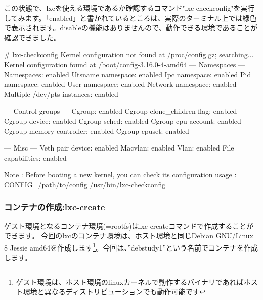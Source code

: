 \documentclass[mingoth,a4paper]{jsarticle}
\begin{document}
この状態で、lxcを使える環境であるか確認するコマンド"lxc-checkconfig"を実行してみます。「enabled」と書かれているところは、実際のターミナル上では緑色で表示されます。disableの機能はありませんので、動作できる環境であることが確認できました。

\begin{commandline}
  # lxc-checkconfig
  Kernel configuration not found at /proc/config.gz; searching...
  Kernel configuration found at /boot/config-3.16.0-4-amd64
  --- Namespaces ---
  Namespaces: enabled
  Utsname namespace: enabled
  Ipc namespace: enabled
  Pid namespace: enabled
  User namespace: enabled
  Network namespace: enabled
  Multiple /dev/pts instances: enabled

  --- Control groups ---
  Cgroup: enabled
  Cgroup clone_children flag: enabled
  Cgroup device: enabled
  Cgroup sched: enabled
  Cgroup cpu account: enabled
  Cgroup memory controller: enabled
  Cgroup cpuset: enabled

  --- Misc ---
  Veth pair device: enabled
  Macvlan: enabled
  Vlan: enabled
  File capabilities: enabled

  Note : Before booting a new kernel, you can check its configuration
  usage : CONFIG=/path/to/config /usr/bin/lxc-checkconfig
\end{commandline}

\subsubsection{コンテナの作成:lxc-create}

ゲスト環境となるコンテナ環境(=rootfs)はlxc-createコマンドで作成することができます。
今回のlxcのコンテナ環境は、ホスト環境と同じDebian GNU/Linux 8 Jessie amd64を作成します\footnote{ゲスト環境は、ホスト環境のlinuxカーネルで動作するバイナリであればホスト環境と異なるディストリビューションでも動作可能です}。今回は、''debstudy1''という名前でコンテナを作成します。
\end{document}

